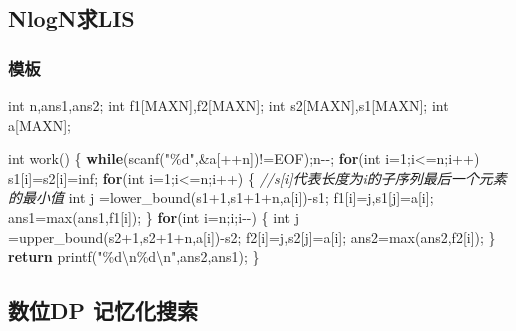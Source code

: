\documentclass[
]{article}
\newenvironment{Shaded}{}{}
\newcommand{\CommentTok}[1]{\textcolor[rgb]{0.38,0.63,0.69}{\textit{#1}}}
\newcommand{\ControlFlowTok}[1]{\textcolor[rgb]{0.00,0.44,0.13}{\textbf{#1}}}
\newcommand{\DataTypeTok}[1]{\textcolor[rgb]{0.56,0.13,0.00}{#1}}
\newcommand{\DecValTok}[1]{\textcolor[rgb]{0.25,0.63,0.44}{#1}}
\newcommand{\NormalTok}[1]{#1}
\newcommand{\SpecialCharTok}[1]{\textcolor[rgb]{0.25,0.44,0.63}{#1}}
\newcommand{\StringTok}[1]{\textcolor[rgb]{0.25,0.44,0.63}{#1}}
\begin{document}
\hypertarget{nlognux6c42lis}{%
\subsection{NlogN求LIS}\label{nlognux6c42lis}}

\hypertarget{ux6a21ux677f-13}{%
\subsubsection{模板}\label{ux6a21ux677f-13}}

\begin{Shaded}
\begin{Highlighting}[]
\DataTypeTok{int}\NormalTok{ n,ans1,ans2;}
\DataTypeTok{int}\NormalTok{ f1[MAXN],f2[MAXN];}
\DataTypeTok{int}\NormalTok{ s2[MAXN],s1[MAXN];}
\DataTypeTok{int}\NormalTok{ a[MAXN];}

\DataTypeTok{int}\NormalTok{ work()}
\NormalTok{\{}
    \ControlFlowTok{while}\NormalTok{(scanf(}\StringTok{"}\SpecialCharTok{\%d}\StringTok{"}\NormalTok{,\&a[++n])!=EOF);n{-}{-};}
    \ControlFlowTok{for}\NormalTok{(}\DataTypeTok{int}\NormalTok{ i=}\DecValTok{1}\NormalTok{;i\textless{}=n;i++) s1[i]=s2[i]=inf;}
    \ControlFlowTok{for}\NormalTok{(}\DataTypeTok{int}\NormalTok{ i=}\DecValTok{1}\NormalTok{;i\textless{}=n;i++)}
\NormalTok{    \{}
        \CommentTok{//s[i]代表长度为i的子序列最后一个元素的最小值}
        \DataTypeTok{int}\NormalTok{ j =lower\_bound(s1+}\DecValTok{1}\NormalTok{,s1+}\DecValTok{1}\NormalTok{+n,a[i]){-}s1;}
\NormalTok{        f1[i]=j,s1[j]=a[i];}
\NormalTok{        ans1=max(ans1,f1[i]);}
\NormalTok{    \}}
    \ControlFlowTok{for}\NormalTok{(}\DataTypeTok{int}\NormalTok{ i=n;i;i{-}{-})}
\NormalTok{    \{}
        \DataTypeTok{int}\NormalTok{ j =upper\_bound(s2+}\DecValTok{1}\NormalTok{,s2+}\DecValTok{1}\NormalTok{+n,a[i]){-}s2;}
\NormalTok{        f2[i]=j,s2[j]=a[i];}
\NormalTok{        ans2=max(ans2,f2[i]);}
\NormalTok{    \}}
    \ControlFlowTok{return}\NormalTok{ printf(}\StringTok{"}\SpecialCharTok{\%d\textbackslash{}n\%d\textbackslash{}n}\StringTok{"}\NormalTok{,ans2,ans1);}
\NormalTok{\}}
\end{Highlighting}
\end{Shaded}

\hypertarget{ux6570ux4f4ddp-ux8bb0ux5fc6ux5316ux641cux7d22}{%
\subsection{数位DP
记忆化搜索}\label{ux6570ux4f4ddp-ux8bb0ux5fc6ux5316ux641cux7d22}}
\end{document}

